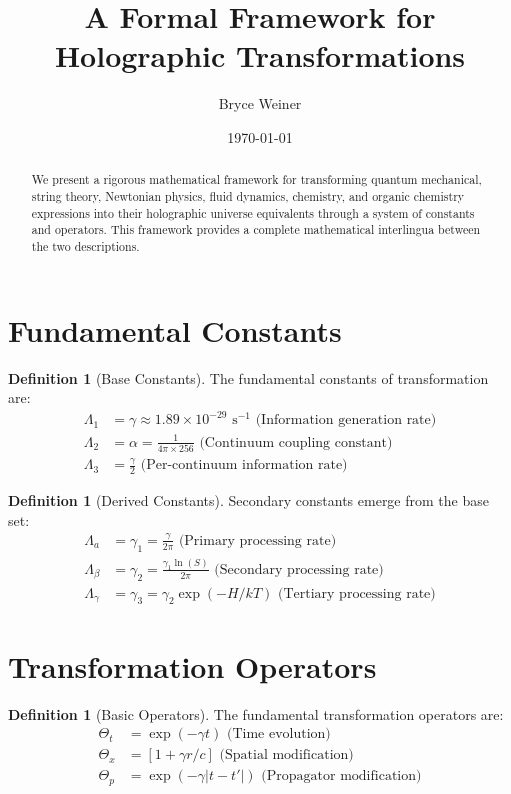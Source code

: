 \documentclass{article}
\title{A Formal Framework for Holographic Transformations}
\author{Bryce Weiner}
\date{\today}
\theoremstyle{plain}
\theoremstyle{definition}
\newtheorem{definition}[theorem]{Definition}
\theoremstyle{remark}
\begin{document}
\maketitle

\begin{abstract}
We present a rigorous mathematical framework for transforming quantum mechanical, string theory, Newtonian physics, fluid dynamics, chemistry, and organic chemistry expressions into their holographic universe equivalents through a system of constants and operators. This framework provides a complete mathematical interlingua between the two descriptions.
\end{abstract}

\section{Fundamental Constants}

\begin{definition}[Base Constants]
The fundamental constants of transformation are:
\begin{align*}
\Lambda_1 &= \gamma \approx 1.89 \times 10^{-29} \text{ s}^{-1} \text{ (Information generation rate)} \\
\Lambda_2 &= \alpha = \frac{1}{4\pi \times 256} \text{ (Continuum coupling constant)} \\
\Lambda_3 &= \frac{\gamma}{2} \text{ (Per-continuum information rate)}
\end{align*}
\end{definition}

\begin{definition}[Derived Constants]
Secondary constants emerge from the base set:
\begin{align*}
\Lambda_a &= \gamma_1 = \frac{\gamma}{2\pi} \text{ (Primary processing rate)} \\
\Lambda_\beta &= \gamma_2 = \frac{\gamma_1\ln(S)}{2\pi} \text{ (Secondary processing rate)} \\
\Lambda_\gamma &= \gamma_3 = \gamma_2\exp(-H/kT) \text{ (Tertiary processing rate)}
\end{align*}
\end{definition}

\section{Transformation Operators}

\begin{definition}[Basic Operators]
The fundamental transformation operators are:
\begin{align*}
\Theta_t &= \exp(-\gamma t) \text{ (Time evolution)} \\
\Theta_x &= [1 + \gamma r/c] \text{ (Spatial modification)} \\
\Theta_p &= \exp(-\gamma|t-t'|) \text{ (Propagator modification)}
\end{align*}
\end{definition}
\end{document}

